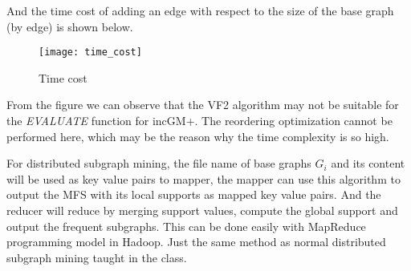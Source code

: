\documentclass[a4paper, 12pt]{report}
\begin{document}
And the time cost of adding an edge with respect to the size of the base graph (by edge) is shown below.

\begin{figure}[H]
\centering
\texttt{[image: time\_cost]}
\caption{Time cost}
\end{figure}

From the figure we can observe that the VF2 algorithm may not be suitable for the \emph{EVALUATE} function for incGM+. The reordering optimization cannot be performed here, which may be the reason why the time complexity is so high.

For distributed subgraph mining,  the file name of base graphs $G_i$ and its content will be used as key value pairs to mapper, the mapper can use this algorithm to output the MFS with its local supports as mapped key value pairs. And the reducer will reduce by merging support values, compute the global support and output the frequent subgraphs. This can be done easily with MapReduce programming model in Hadoop. Just the same method as normal distributed subgraph mining
taught in the class. 
{}

\end{document}
